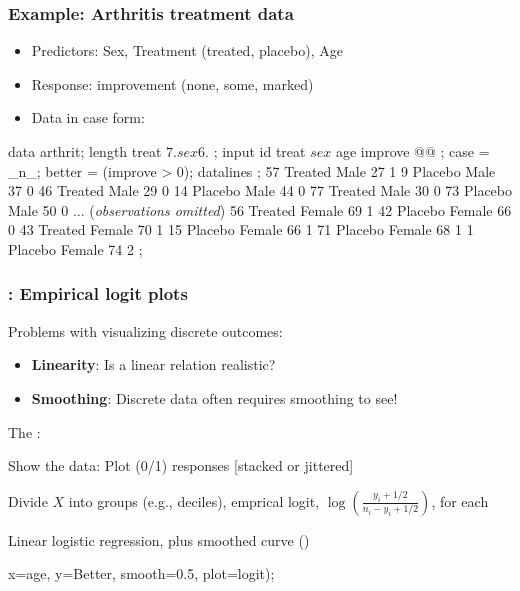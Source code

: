 \begin{frame}[fragile]
  \frametitle{Example: Arthritis treatment data}
  \begin{itemize}
  	\item Predictors: Sex, Treatment (treated, placebo), Age
	\item Response: improvement (none, some, marked)
	\item Data in case form:
  \end{itemize}
\begin{Input}[fontsize=\small,label=\fbox{\texttt{arthrit.sas}},baselinestretch=0.7]
data arthrit;
   length treat $7. sex $6. ;
   input id treat $ sex $ age improve @@ ;
   case = _n_;
   better  = (improve > 0);  
datalines ;
57 Treated Male   27 1   9 Placebo Male   37 0
46 Treated Male   29 0  14 Placebo Male   44 0
77 Treated Male   30 0  73 Placebo Male   50 0
  ... (\emph{observations omitted})
56 Treated Female 69 1  42 Placebo Female 66 0
43 Treated Female 70 1  15 Placebo Female 66 1
                        71 Placebo Female 68 1
                         1 Placebo Female 74 2
;
\end{Input}
\end{frame}


\begin{frame}[fragile]
  \frametitle{: Empirical logit plots}
  Problems with visualizing discrete outcomes:
  \begin{itemize}
	\item{\large\bfseries Linearity}: Is a linear relation realistic?
	\item{\large\bfseries Smoothing}: Discrete data often requires smoothing to see!
  \end{itemize}

The :
   \begin{itemize*}
   \item Show the data: Plot (0/1) responses [stacked or jittered]
   \item Divide $X$ into groups (e.g., deciles), emprical logit,
   $\log \left(\frac{y_i + 1/2}{n_i - y_i + 1/2}\right)$,
   for each
   \item Linear logistic regression, plus smoothed curve ()
   \end{itemize*}
\vspace{1ex}
\begin{Input}
    x=age, y=Better,  
    smooth=0.5,       
    plot=logit);      
\end{Input}
\end{frame}

